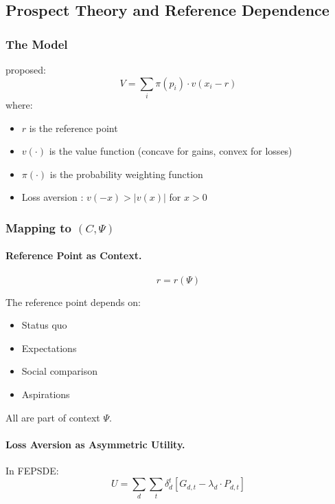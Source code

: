 \subsection{Prospect Theory and Reference Dependence}
\label{app:prospecttheory}

\subsubsection{The Model}

\citet{kahnemantversky1979} proposed:
\begin{equation}
  V = \sum_i \pi(p_i) \cdot v(x_i - r)
\end{equation}
where:
\begin{itemize}
  \item $r$ is the reference point
  \item $v(\cdot)$ is the value function (concave for gains, convex for losses)
  \item $\pi(\cdot)$ is the probability weighting function
  \item Loss aversion \citep{tverskykahneman1991}: $v(-x) > |v(x)|$ for $x > 0$
\end{itemize}

\subsubsection{Mapping to $(C, \Psi)$}

\paragraph{Reference Point as Context.}
\begin{equation}
  r = r(\Psi)
\end{equation}

The reference point depends on:
\begin{itemize}
  \item Status quo
  \item Expectations
  \item Social comparison
  \item Aspirations
\end{itemize}

All are part of context $\Psi$.

\paragraph{Loss Aversion as Asymmetric Utility.}
In FEPSDE:
\begin{equation}
  U = \sum_d \sum_t \delta_d^t [G_{d,t} - \lambda_d \cdot P_{d,t}]
\end{equation}

